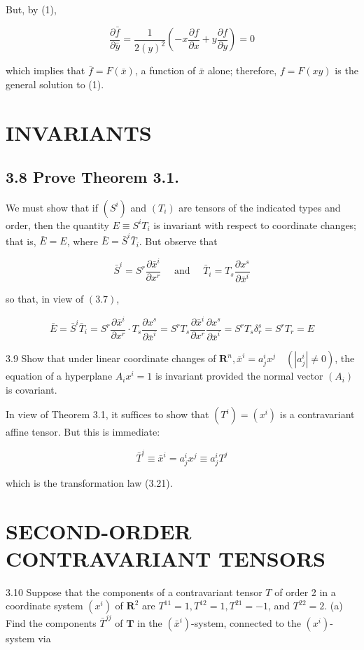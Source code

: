 \documentclass[10pt]{article}
\begin{document}
But, by (1),

$$
\frac{\partial \bar{f}}{\partial \bar{y}}=\frac{1}{2(y)^{2}}\left(-x \frac{\partial f}{\partial x}+y \frac{\partial f}{\partial y}\right)=0
$$

which implies that $\bar{f}=F(\bar{x})$, a function of $\bar{x}$ alone; therefore, $f=F(x y)$ is the general solution to (1).

\section*{INVARIANTS}
\subsection*{3.8 Prove Theorem 3.1.}
We must show that if $\left(S^{i}\right)$ and $\left(T_{i}\right)$ are tensors of the indicated types and order, then the quantity $E \equiv S^{i} T_{i}$ is invariant with respect to coordinate changes; that is, $\bar{E}=E$, where $\bar{E}=\bar{S}^{i} \bar{T}_{i}$. But observe that

$$
\bar{S}^{i}=S^{r} \frac{\partial \bar{x}^{i}}{\partial x^{r}} \quad \text { and } \quad \bar{T}_{i}=T_{s} \frac{\partial x^{s}}{\partial \bar{x}^{i}}
$$

so that, in view of $(3.7)$,

$$
\bar{E}=\bar{S}^{i} \bar{T}_{i}=S^{r} \frac{\partial \bar{x}^{i}}{\partial x^{r}} \cdot T_{s} \frac{\partial x^{s}}{\partial \bar{x}^{i}}=S^{r} T_{s} \frac{\partial \bar{x}^{i}}{\partial x^{r}} \frac{\partial x^{s}}{\partial \bar{x}^{i}}=S^{r} T_{s} \delta_{r}^{s}=S^{r} T_{r}=E
$$

3.9 Show that under linear coordinate changes of $\mathbf{R}^{n}, \bar{x}^{i}=a_{j}^{i} x^{j} \quad\left(\left|a_{j}^{i}\right| \neq 0\right)$, the equation of a hyperplane $A_{i} x^{i}=1$ is invariant provided the normal vector $\left(A_{i}\right)$ is covariant.

In view of Theorem 3.1, it suffices to show that $\left(T^{i}\right)=\left(x^{i}\right)$ is a contravariant affine tensor. But this is immediate:

$$
\bar{T}^{i} \equiv \bar{x}^{i}=a_{j}^{i} x^{j} \equiv a_{j}^{i} T^{j}
$$

which is the transformation law (3.21).

\section*{SECOND-ORDER CONTRAVARIANT TENSORS}
3.10 Suppose that the components of a contravariant tensor $T$ of order 2 in a coordinate system $\left(x^{i}\right)$ of $\mathbf{R}^{2}$ are $T^{11}=1, T^{12}=1, T^{21}=-1$, and $T^{22}=2$. (a) Find the components $\bar{T}^{j j}$ of $\mathbf{T}$ in the $\left(\bar{x}^{i}\right)$-system, connected to the $\left(x^{i}\right)$-system via
\end{document}
